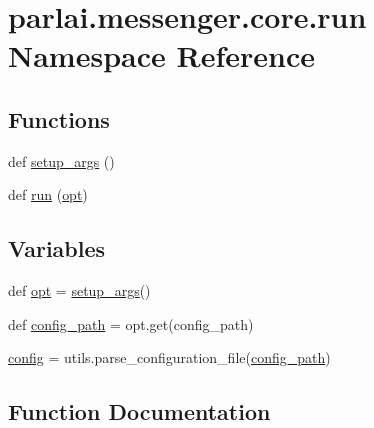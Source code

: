 \hypertarget{namespaceparlai_1_1messenger_1_1core_1_1run}{}\section{parlai.\+messenger.\+core.\+run Namespace Reference}
\label{namespaceparlai_1_1messenger_1_1core_1_1run}
\subsection*{Functions}
\begin{DoxyCompactItemize}
\item 
def \hyperlink{namespaceparlai_1_1messenger_1_1core_1_1run_a32e58ff98e486caecc5f8941e70db244}{setup\+\_\+args} ()
\item 
def \hyperlink{namespaceparlai_1_1messenger_1_1core_1_1run_a198ee6d516ff4450d6cee1aa7b1d37b7}{run} (\hyperlink{namespaceparlai_1_1messenger_1_1core_1_1run_af3614368a24b91db4ebaeb81865b09a1}{opt})
\end{DoxyCompactItemize}
\subsection*{Variables}
\begin{DoxyCompactItemize}
\item 
def \hyperlink{namespaceparlai_1_1messenger_1_1core_1_1run_af3614368a24b91db4ebaeb81865b09a1}{opt} = \hyperlink{namespaceparlai_1_1messenger_1_1core_1_1run_a32e58ff98e486caecc5f8941e70db244}{setup\+\_\+args}()
\item 
def \hyperlink{namespaceparlai_1_1messenger_1_1core_1_1run_a98d6a2a74014b613043f52299a3b057c}{config\+\_\+path} = opt.\+get(\textquotesingle{}config\+\_\+path\textquotesingle{})
\item 
\hyperlink{namespaceparlai_1_1messenger_1_1core_1_1run_afd96c3dc0b92a7b4965c9d97ac6453a2}{config} = utils.\+parse\+\_\+configuration\+\_\+file(\hyperlink{namespaceparlai_1_1messenger_1_1core_1_1run_a98d6a2a74014b613043f52299a3b057c}{config\+\_\+path})
\end{DoxyCompactItemize}


\subsection{Function Documentation}
\mbox{\label{namespaceparlai_1_1messenger_1_1core_1_1run_a198ee6d516ff4450d6cee1aa7b1d37b7}} 
